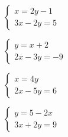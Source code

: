 \documentclass[12pt,a4paper]{article}
\begin{document}
\begin{enumerate}[label=\alph*), itemsep=1.2cm]
\begin{minipage}[t]{0.45\textwidth}
    \item $\begin{cases} x = 2y - 1 \\ 3x - 2y = 5 \end{cases}$
    \item $\begin{cases} y = x + 2 \\ 2x - 3y = -9 \end{cases}$
    \item $\begin{cases} x = 4y \\ 2x - 5y = 6 \end{cases}$
    \item $\begin{cases} y = 5 - 2x \\ 3x + 2y = 9 \end{cases}$
    \end{minipage}
\end{enumerate}
\end{document}
